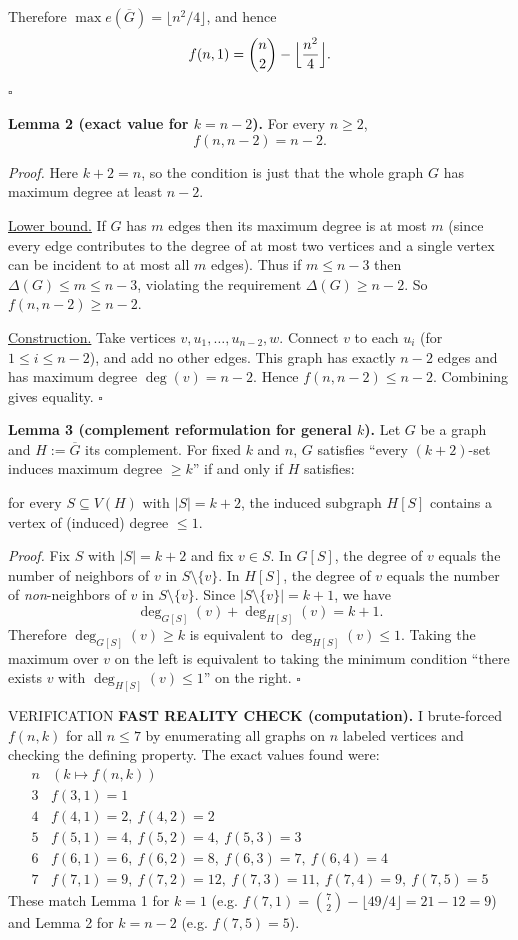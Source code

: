 Therefore $\max e(\overline{G}) = \lfloor n^2/4\rfloor$, and hence
\[
 f(n,1)=\binom{n}{2}-\Bigl\lfloor\frac{n^2}{4}\Bigr\rfloor.
\]
\hfill $\square$

\medskip
\textbf{Lemma 2 (exact value for $k=n-2$).}
For every $n\ge2$,
\[
 f(n,n-2)=n-2.
\]

\emph{Proof.}
Here $k+2=n$, so the condition is just that the whole graph $G$ has
maximum degree at least $n-2$.

\underline{Lower bound.}
If $G$ has $m$ edges then its maximum degree is at most $m$ (since every edge
contributes to the degree of at most two vertices and a single vertex can be
incident to at most all $m$ edges). Thus if $m\le n-3$ then
$\Delta(G)\le m\le n-3$, violating the requirement $\Delta(G)\ge n-2$.
So $f(n,n-2)\ge n-2$.

\underline{Construction.}
Take vertices $v,u_1,\dots,u_{n-2},w$.
Connect $v$ to each $u_i$ (for $1\le i\le n-2$), and add no other edges.
This graph has exactly $n-2$ edges and has maximum degree $\deg(v)=n-2$.
Hence $f(n,n-2)\le n-2$.
Combining gives equality.
\hfill $\square$

\medskip
\textbf{Lemma 3 (complement reformulation for general $k$).}
Let $G$ be a graph and $H:=\overline{G}$ its complement.
For fixed $k$ and $n$, $G$ satisfies
``every $(k+2)$-set induces maximum degree $\ge k$''
if and only if $H$ satisfies:

\medskip
\noindent for every $S\subseteq V(H)$ with $|S|=k+2$, the induced subgraph $H[S]$
contains a vertex of (induced) degree $\le 1$.

\emph{Proof.}
Fix $S$ with $|S|=k+2$ and fix $v\in S$.
In $G[S]$, the degree of $v$ equals the number of neighbors of $v$ in $S\setminus\{v\}$.
In $H[S]$, the degree of $v$ equals the number of \emph{non}-neighbors of $v$ in
$S\setminus\{v\}$.
Since $|S\setminus\{v\}|=k+1$, we have
\[
\deg_{G[S]}(v) + \deg_{H[S]}(v) = k+1.
\]
Therefore $\deg_{G[S]}(v)\ge k$ is equivalent to $\deg_{H[S]}(v)\le 1$.
Taking the maximum over $v$ on the left is equivalent to taking the minimum
condition ``there exists $v$ with $\deg_{H[S]}(v)\le 1$'' on the right.
\hfill $\square$

VERIFICATION
\textbf{FAST REALITY CHECK (computation).}
I brute-forced $f(n,k)$ for all $n\le7$ by enumerating all graphs on $n$ labeled
vertices and checking the defining property.
The exact values found were:
\[
\begin{array}{c|l}
 n & (k\mapsto f(n,k))\\\hline
3 & f(3,1)=1\\
4 & f(4,1)=2,\ f(4,2)=2\\
5 & f(5,1)=4,\ f(5,2)=4,\ f(5,3)=3\\
6 & f(6,1)=6,\ f(6,2)=8,\ f(6,3)=7,\ f(6,4)=4\\
7 & f(7,1)=9,\ f(7,2)=12,\ f(7,3)=11,\ f(7,4)=9,\ f(7,5)=5
\end{array}
\]
These match Lemma 1 for $k=1$ (e.g. $f(7,1)=\binom72-\lfloor 49/4\rfloor=21-12=9$)
and Lemma 2 for $k=n-2$ (e.g. $f(7,5)=5$).

